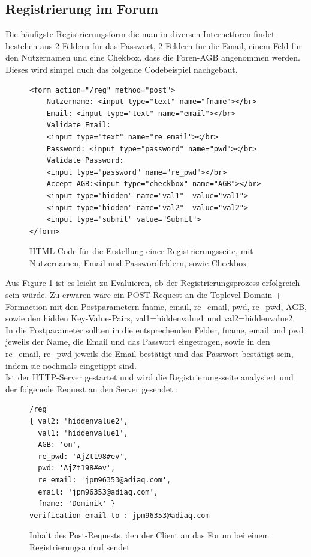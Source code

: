 \subsection{Registrierung im Forum}
Die häufigste Registrierungsform die man in diversen Internetforen findet bestehen aus 2 Feldern für das Passwort, 2 Feldern für die Email, einem Feld für den Nutzernamen und eine Chekbox, dass die Foren-AGB angenommen werden. Dieses wird simpel duch das folgende Codebeispiel nachgebaut.

\begin{figure}[h!]
\begin{lstlisting}[language=HTML5]
<form action="/reg" method="post">
	Nutzername: <input type="text" name="fname"></br>
	Email: <input type="text" name="email"></br>
	Validate Email: 
	<input type="text" name="re_email"></br>
	Password: <input type="password" name="pwd"></br>
	Validate Password: 
	<input type="password" name="re_pwd"></br>
	Accept AGB:<input type="checkbox" name="AGB"></br>
 	<input type="hidden" name="val1"  value="val1">
  	<input type="hidden" name="val2"  value="val2">
	<input type="submit" value="Submit">
</form>
\end{lstlisting}
\caption{HTML-Code für die Erstellung einer Registrierungsseite, mit Nutzernamen, Email und Passwordfeldern, sowie Checkbox}
\end{figure}
\newpage

Aus Figure 1  ist es leicht zu Evaluieren, ob der Registrierungsprozess erfolgreich sein würde. Zu erwaren wäre ein POST-Request an die Toplevel Domain + Formaction mit den Postparametern fname, email, re\_email, pwd, re\_pwd, AGB, sowie den hidden Key-Value-Pairs, val1=hiddenvalue1 und val2=hiddenvalue2.\\
In die Postparameter sollten in die entsprechenden Felder, fname, email und pwd jeweils der Name, die Email und das Passwort eingetragen, sowie in den re\_email, re\_pwd jeweils die Email bestätigt und das Passwort bestätigt sein, indem sie nochmals eingetippt sind.\\
Ist der HTTP-Server gestartet und wird die Registrierungsseite analysiert und der folgenede Request an den Server gesendet :

\begin{figure}[ht]
\begin{lstlisting}[language=HTML5]
/reg
{ val2: 'hiddenvalue2',
  val1: 'hiddenvalue1',
  AGB: 'on',
  re_pwd: 'AjZt198#ev',
  pwd: 'AjZt198#ev',
  re_email: 'jpm96353@adiaq.com',
  email: 'jpm96353@adiaq.com',
  fname: 'Dominik' }
verification email to : jpm96353@adiaq.com
\end{lstlisting}
\caption{Inhalt des Post-Requests, den der Client an das Forum bei einem Registrierungsaufruf sendet}
\end{figure}

